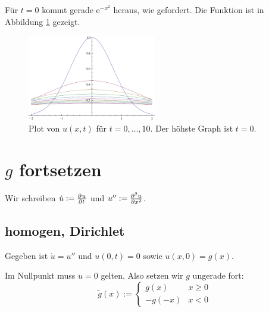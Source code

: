 \documentclass[11pt, ngerman, fleqn]{article}
\newcommand{\ee}{\mathrm e}
\begin{document}
Für $t = 0$ kommt gerade $\ee^{-x^2}$ heraus, wie gefordert. Die Funktion ist
in Abbildung \ref{fig:1-plot} gezeigt.

\begin{figure}
	\centering
	\includegraphics[width=0.5\textwidth]{1-plot.pdf}
	\caption{Plot von $u(x, t)$ für $t = 0, \ldots, 10$. Der höhste Graph ist $t=0$.}
	\label{fig:1-plot}
\end{figure}



\section{$g$ fortsetzen}
\label{3}

Wir schreiben $\dot u := \pd ut$ und $u'' := \pd[2] ux$.

\subsection{homogen, Dirichlet}
\label{a}

Gegeben ist $\dot u = u''$ und $u(0, t) = 0$ sowie $u(x, 0) = g(x)$.

Im Nullpunkt muss $u=0$ gelten. Also setzen wir $g$ ungerade fort:
\[
	\tilde g(x) := \begin{cases}
		g(x) & x \geq 0 \\
	  -g(-x) & x < 0
	\end{cases}
\]
\end{document}
